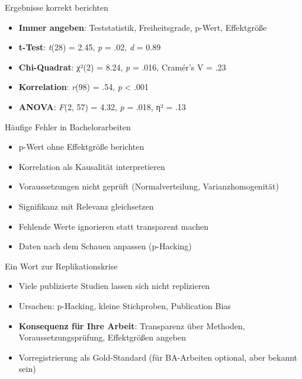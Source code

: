 \documentclass[
  ignorenonframetext,
]{beamer}
\providecommand{\tightlist}{%
  \setlength{\itemsep}{0pt}\setlength{\parskip}{0pt}}
\begin{document}
\begin{frame}{Ergebnisse korrekt berichten}
\protect{}\label{ergebnisse-korrekt-berichten}
\begin{itemize}
\tightlist
\item
  \textbf{Immer angeben}: Teststatistik, Freiheitsgrade, p-Wert,
  Effektgröße
\item
  \textbf{t-Test}: \emph{t}(28) = 2.45, \emph{p} = .02, \emph{d} = 0.89
\item
  \textbf{Chi-Quadrat}: χ²(2) = 8.24, \emph{p} = .016, Cramér's V = .23
\item
  \textbf{Korrelation}: \emph{r}(98) = .54, \emph{p} \textless{} .001
\item
  \textbf{ANOVA}: \emph{F}(2, 57) = 4.32, \emph{p} = .018, η² = .13
\end{itemize}
\end{frame}

\begin{frame}{Häufige Fehler in Bachelorarbeiten}
\protect{}\label{huxe4ufige-fehler-in-bachelorarbeiten}
\begin{itemize}
\tightlist
\item
  p-Wert ohne Effektgröße berichten
\item
  Korrelation als Kausalität interpretieren
\item
  Voraussetzungen nicht geprüft (Normalverteilung, Varianzhomogenität)
\item
  Signifikanz mit Relevanz gleichsetzen
\item
  Fehlende Werte ignorieren statt transparent machen
\item
  Daten nach dem Schauen anpassen (p-Hacking)
\end{itemize}
\end{frame}

\begin{frame}{Ein Wort zur Replikationskrise}
\protect{}\label{ein-wort-zur-replikationskrise}
\begin{itemize}
\tightlist
\item
  Viele publizierte Studien lassen sich nicht replizieren
\item
  Ursachen: p-Hacking, kleine Stichproben, Publication Bias
\item
  \textbf{Konsequenz für Ihre Arbeit}: Transparenz über Methoden,
  Voraussetzungsprüfung, Effektgrößen angeben
\item
  Vorregistrierung als Gold-Standard (für BA-Arbeiten optional, aber
  bekannt sein)
\end{itemize}
\end{frame}
\end{document}
